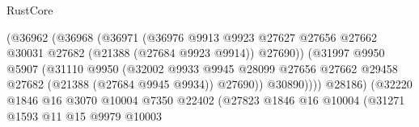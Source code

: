 \begin{lexlean}{RustCore}
\begin{coremodule}
                                            (@36962
                                              (@36968
                                                (@36971
                                                  (@36976
                                                    @9913
                                                    @9923
                                                    @27627
                                                    @27656
                                                    @27662
                                                    @30031
                                                    @27682
                                                    (@21388 (@27684 @9923 @9914))
                                                    @27690))
                                                (@31997
                                                  @9950
                                                  @5907
                                                  (@31110
                                                    @9950
                                                    (@32002
                                                      @9933
                                                      @9945
                                                      @28099
                                                      @27656
                                                      @27662
                                                      @29458
                                                      @27682
                                                      (@21388 (@27684 @9945 @9934))
                                                      @27690))
                                                  @30890))))
                                          @28186)
                                        (@32220
                                          @1846
                                          @16
                                          @3070
                                          @10004
                                          @7350
                                          @22402
                                          (@27823
                                            @1846
                                            @16
                                            @10004
                                            (@31271
                                              @1593
                                              @11
                                              @15
                                              @9979
                                              @10003

\end{coremodule}
\end{lexlean}
